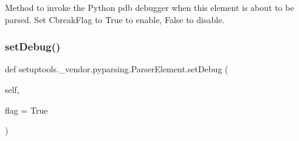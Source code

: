 \begin{DoxyVerb}Method to invoke the Python pdb debugger when this element is
   about to be parsed. Set C{breakFlag} to True to enable, False to
   disable.
\end{DoxyVerb}
 \mbox{\label{classsetuptools_1_1__vendor_1_1pyparsing_1_1ParserElement_ae589616c030e7bc76f86c139b60e2bc6}} 
\subsubsection{\texorpdfstring{set\+Debug()}{setDebug()}}
{\footnotesize\ttfamily def setuptools.\+\_\+vendor.\+pyparsing.\+Parser\+Element.\+set\+Debug (\begin{DoxyParamCaption}\item[{}]{self,  }\item[{}]{flag = {\ttfamily True} }\end{DoxyParamCaption})}

